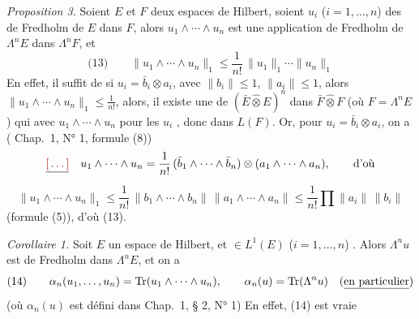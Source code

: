\documentclass[11pt,a4paper]{article}
\begin{document}
\emph{Proposition 3.} Soient $E$ et $F$ deux espaces de Hilbert, soient $u_i$ ($i = 1, \ldots, n$) des  de Fredholm de $E$ dans $F$, alors $u_1 \wedge \cdots \wedge u_n$ est une application de Fredholm de $\Lambda^{n} E$ dans $\Lambda^{n} F$, et
\[
  \text{(13)}\qquad \|u_1 \wedge \cdots \wedge u_n\|_1 \leq \frac{1}{n!}\, \|u_1\|_1 \cdots \|u_n\|_1
\]
En effet, il suffit de    si  $u_i = \bar{b}_i \otimes a_i$, \struck{\ill{}} avec $\|b_i\| \leq 1$, $\|a_i\| \leq 1$, alors $\|u_1 \wedge \cdots \wedge u_n\|_1 \leq \frac{1}{n!}$, \struck{\ill{}}  alors, il existe une     de $(\bar{E} \mathbin{\hat{\otimes}} E)^{n}$ dans $\bar{F} \mathbin{\hat{\otimes}} F$ (où $F = \Lambda^{n} E$) qui  avec  $u_1 \wedge \cdots \wedge u_n$ pour les $u_i$ , donc        \struck{\ill{}} \ill{} \ill{} \ill{} dans $L(F)$. Or, pour $u_i = \bar{b}_i \otimes a_i$, on a ( Chap.~1, N° 1, formule (8))
\[
  \struck{\ill{}}\quad u_1 \wedge \cdots \wedge u_n = \frac{1}{n!}\, (\bar{b}_1 \wedge \cdots \wedge \bar{b}_n) \otimes (a_1 \wedge \cdots \wedge a_n), \qquad \text{d'où}
\]
\[
  \|u_1 \wedge \cdots \wedge u_n\|_1 \leq \frac{1}{n!}\, \|b_1 \wedge \cdots \wedge b_n\|\, \|a_1 \wedge \cdots \wedge a_n\| \leq \frac{1}{n!} \prod \|a_i\|\, \|b_i\|
\]
(formule (5)), d'où (13).

\emph{Corollaire 1.} Soit $E$ un espace de Hilbert, et  $\in L^{1}(E)$ ($i = 1, \ldots, n$) . Alors $\Lambda^{n} u$ est   de Fredholm dans $\Lambda^{n} E$, et on a
\[
  \text{(14)}\qquad \alpha_n(u_1, \ldots, u_n) = \operatorname{Tr}(u_1 \wedge \cdots \wedge u_n), \qquad \alpha_n(u) = \operatorname{Tr}(\Lambda^{n} u) \quad (\uncertain{\text{en particulier}})
\]
(où $\alpha_n(u)$ est défini dans Chap.~1, § 2, N° 1)  En effet, (14) est vraie   
\end{document}
